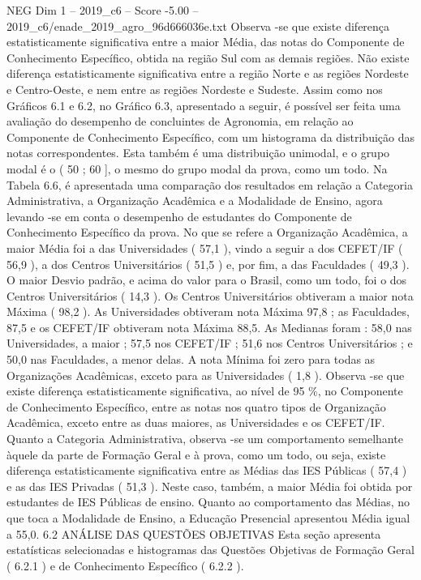 \begin{textsample}{NEG Dim 1 – 2019\_c6 – Score -5.00 – 2019\_c6/enade\_2019\_agro\_96d666036e.txt}
Observa -se que existe diferença estatisticamente significativa entre a maior Média, das notas do Componente de Conhecimento Específico, obtida na região Sul com as demais regiões.
Não existe diferença estatisticamente significativa entre a região Norte e as regiões Nordeste e Centro-Oeste, e nem entre as regiões Nordeste e Sudeste.
Assim como nos Gráficos 6.1 e 6.2, no Gráfico 6.3, apresentado a seguir, é possível ser feita uma avaliação do desempenho de concluintes de Agronomia, em relação ao Componente de Conhecimento Específico, com um histograma da distribuição das notas correspondentes.
Esta também é uma distribuição unimodal, e o grupo modal é o ( 50 ; 60 ], o mesmo do grupo modal da prova, como um todo.
Na Tabela 6.6, é apresentada uma comparação dos resultados em relação a Categoria Administrativa, a Organização Acadêmica e a Modalidade de Ensino, agora levando -se em conta o desempenho de estudantes do Componente de Conhecimento Específico da prova.
No que se refere a Organização Acadêmica, a maior Média foi a das Universidades ( 57,1 ), vindo a seguir a dos CEFET/IF ( 56,9 ), a dos Centros Universitários ( 51,5 ) e, por fim, a das Faculdades ( 49,3 ).
O maior Desvio padrão, e acima do valor para o Brasil, como um todo, foi o dos Centros Universitários ( 14,3 ).
Os Centros Universitários obtiveram a maior nota Máxima ( 98,2 ).
As Universidades obtiveram nota Máxima 97,8 ; as Faculdades, 87,5 e os CEFET/IF obtiveram nota Máxima 88,5.
As Medianas foram : 58,0 nas Universidades, a maior ; 57,5 nos CEFET/IF ; 51,6 nos Centros Universitários ; e 50,0 nas Faculdades, a menor delas.
A nota Mínima foi zero para todas as Organizações Acadêmicas, exceto para as Universidades ( 1,8 ).
Observa -se que existe diferença estatisticamente significativa, ao nível de 95 \%, no Componente de Conhecimento Específico, entre as notas nos quatro tipos de Organização Acadêmica, exceto entre as duas maiores, as Universidades e os CEFET/IF.
Quanto a Categoria Administrativa, observa -se um comportamento semelhante àquele da parte de Formação Geral e à prova, como um todo, ou seja, existe diferença estatisticamente significativa entre as Médias das IES Públicas ( 57,4 ) e as das IES Privadas ( 51,3 ).
Neste caso, também, a maior Média foi obtida por estudantes de IES Públicas de ensino.
Quanto ao comportamento das Médias, no que toca a Modalidade de Ensino, a Educação Presencial apresentou Média igual a 55,0. 6.2 ANÁLISE DAS QUESTÕES OBJETIVAS Esta seção apresenta estatísticas selecionadas e histogramas das Questões Objetivas de Formação Geral ( 6.2.1 ) e de Conhecimento Específico ( 6.2.2 ).

\end{textsample}
